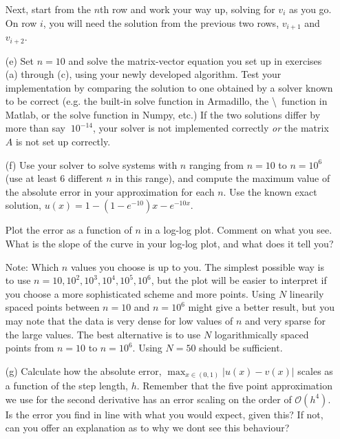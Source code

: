 \documentclass[11pt,a4wide]{article}
\begin{document}
\begin{itemize}
Next, start from the $n$th row and work your way up, solving for $v_i$ as you go. On row $i$, you will need the solution from the previous two rows, $v_{i+1}$ and $v_{i+2}$.
\item[(e)] Set $n=10$ and solve the matrix-vector equation you set up in exercises (a) through (c), using your newly developed algorithm.
  Test your implementation by comparing the solution to one obtained by a solver known to be correct (e.g. the built-in solve function in Armadillo, the \textbackslash \ function in Matlab, or the solve function in Numpy, etc.) If the two solutions differ by more than say $~10^{-14}$, your solver is not implemented correctly \emph{or} the matrix $A$ is not set up correctly.

  \item[(f)] Use your solver to solve systems with $n$ ranging from $n=10$ to $n=10^6$ (use at least $6$ different $n$ in this range), and compute the maximum value of the absolute error in your approximation for each $n$. Use the known exact solution, $u(x) = 1-(1-e^{-10})x-e^{-10x}$. 




  Plot the error as a function of $n$ in a log-log plot. Comment on what you see. What is the slope of the curve in your log-log plot, and what does it tell you? 

  Note: Which $n$ values you choose is up to you. The simplest possible way is to use $n=10,10^2,10^3,10^4,10^5,10^6$, but the plot will be easier to interpret if you choose a more sophisticated scheme and more points. Using $N$ linearily spaced points between $n=10$ and $n=10^6$ might give a better result, but you may note that the data is very dense for low values of $n$ and very sparse for the large values. The best alternative is to use $N$ logarithmically spaced points from $n=10$ to $n=10^6$. Using $N=50$ should be sufficient.
\item[(g)] Calculate how the absolute error, $\max_{x\in(0,1)}|u(x)-v(x)|$ scales as a function of the step length, $h$. Remember that the five point approximation we use for the second derivative has an error scaling on the order of $\mathcal{O}(h^4)$. Is the error you find in line with what you would expect, given this? If not, can you offer an explanation as to why we dont see this behaviour?
\end{itemize}
\end{document}
